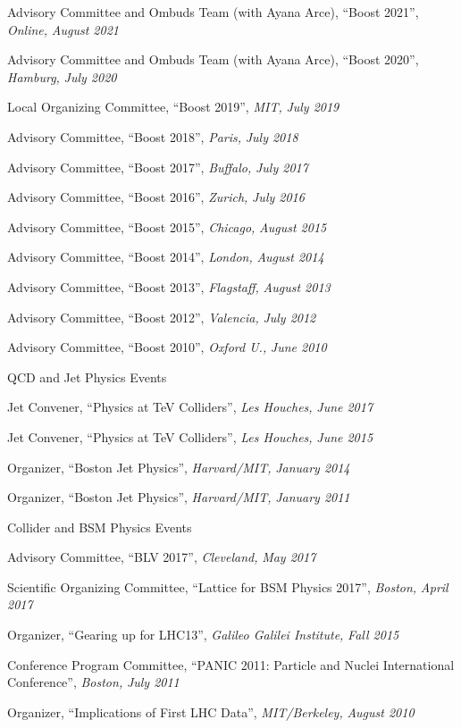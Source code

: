 \item Advisory Committee and Ombuds Team (with Ayana Arce), ``Boost 2021'', \emph{Online, }\emph{August 2021}
\item Advisory Committee and Ombuds Team (with Ayana Arce), ``Boost 2020'', \emph{Hamburg, }\emph{July 2020}
\item Local Organizing Committee, ``Boost 2019'', \emph{MIT, }\emph{July 2019}
\item Advisory Committee, ``Boost 2018'', \emph{Paris, }\emph{July 2018}
\item Advisory Committee, ``Boost 2017'', \emph{Buffalo, }\emph{July 2017}
\item Advisory Committee, ``Boost 2016'', \emph{Zurich, }\emph{July 2016}
\item Advisory Committee, ``Boost 2015'', \emph{Chicago, }\emph{August 2015}
\item Advisory Committee, ``Boost 2014'', \emph{London, }\emph{August 2014}
\item Advisory Committee, ``Boost 2013'', \emph{Flagstaff, }\emph{August 2013}
\item Advisory Committee, ``Boost 2012'', \emph{Valencia, }\emph{July 2012}
\item Advisory Committee, ``Boost 2010'', \emph{Oxford U., }\emph{June 2010}
\el 
\item QCD and Jet Physics Events
\bsbl 
\item Jet Convener, ``Physics at TeV Colliders'', \emph{Les Houches, }\emph{June 2017}
\item Jet Convener, ``Physics at TeV Colliders'', \emph{Les Houches, }\emph{June 2015}
\item Organizer, ``Boston Jet Physics'', \emph{Harvard/MIT, }\emph{January 2014}
\item Organizer, ``Boston Jet Physics'', \emph{Harvard/MIT, }\emph{January 2011}
\el 
\item Collider and BSM Physics Events
\bsbl 
\item Advisory Committee, ``BLV 2017'', \emph{Cleveland, }\emph{May 2017}
\item Scientific Organizing Committee, ``Lattice for BSM Physics 2017'', \emph{Boston, }\emph{April 2017}
\item Organizer, ``Gearing up for LHC13'', \emph{Galileo Galilei Institute, }\emph{Fall 2015}
\item Conference Program Committee, ``PANIC 2011: Particle and Nuclei International Conference'', \emph{Boston, }\emph{July 2011}
\item Organizer, ``Implications of First LHC Data'', \emph{MIT/Berkeley, }\emph{August 2010}
